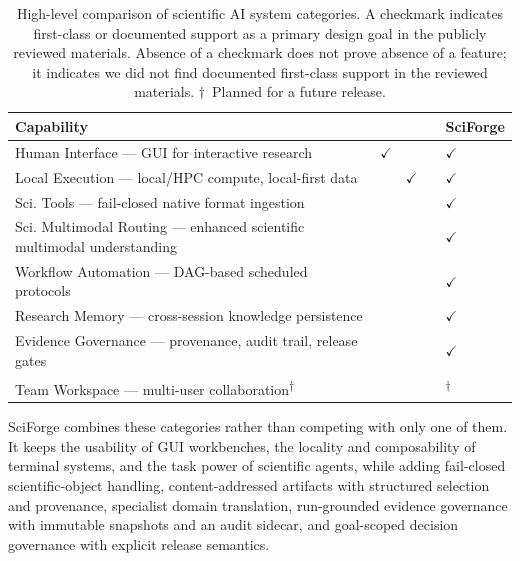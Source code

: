 \documentclass[sn-basic,Numbered,pdflatex]{sn-jnl}
\newcommand{\cmark}{\ensuremath{\checkmark}}
\begin{document}
\begin{table}[ht!]
\caption{High-level comparison of scientific AI system categories. A checkmark indicates first-class or documented support as a primary design goal in the publicly reviewed materials. Absence of a checkmark does not prove absence of a feature; it indicates we did not find documented first-class support in the reviewed materials. $\dagger$~Planned for a future release.}
\label{tab:terminal_related_work}
\scriptsize
\centering
\setlength{\tabcolsep}{3.5pt}
\renewcommand{\arraystretch}{1.15}
\begin{tabular}{@{}L{4.6cm} C{1.30cm} C{1.50cm} C{1.30cm} C{1.50cm}@{}}
\toprule
\textbf{Capability} &
\textbf{} &
\textbf{} &
\textbf{} &
\textbf{SciForge} \\
\midrule
Human Interface --- GUI for interactive research & \cmark &  &  & \cmark \\
Local Execution --- local/HPC compute, local-first data &  & \cmark &  & \cmark \\
Sci. Tools --- fail-closed native format ingestion &  &  &  & \cmark \\
Sci. Multimodal Routing --- enhanced scientific multimodal understanding &  &  &  & \cmark \\
Workflow Automation --- DAG-based scheduled protocols &  &  &  & \cmark \\
Research Memory --- cross-session knowledge persistence &  &  &  & \cmark \\
Evidence Governance --- provenance, audit trail, release gates &  &  &  & \cmark \\
Team Workspace --- multi-user collaboration\textsuperscript{$\dagger$} &  &  &  & \textsuperscript{$\dagger$} \\
\bottomrule
\end{tabular}
\end{table}

SciForge combines these categories rather than competing with only one of them. It keeps the usability of GUI workbenches, the locality and composability of terminal systems, and the task power of scientific agents, while adding fail-closed scientific-object handling, content-addressed artifacts with structured selection and provenance, specialist domain translation, run-grounded evidence governance with immutable snapshots and an audit sidecar, and goal-scoped decision governance with explicit release semantics.
\end{document}
